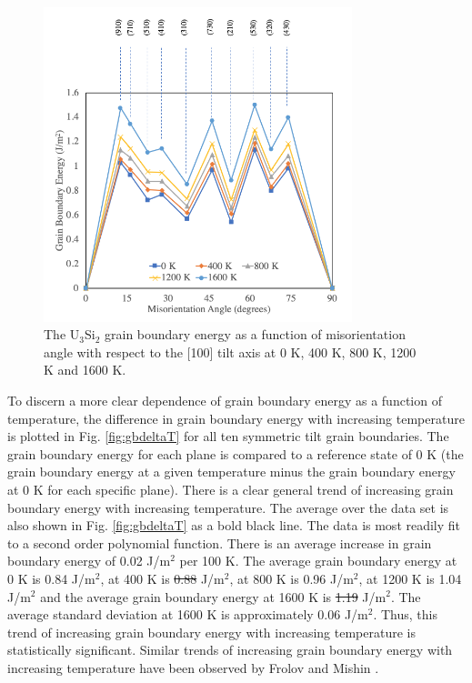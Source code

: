 \documentclass[review]{elsarticle}
\providecommand{\DIFaddtex}[1]{{\protect\color{blue}\uwave{#1}}} %
\providecommand{\DIFdeltex}[1]{{\protect\color{red}\sout{#1}}}                      %
\providecommand{\DIFaddbegin}{} %
\providecommand{\DIFaddend}{} %
\providecommand{\DIFdelbegin}{} %
\providecommand{\DIFdelend}{} %
\providecommand{\DIFadd}[1]{\texorpdfstring{\DIFaddtex{#1}}{#1}} %
\providecommand{\DIFdel}[1]{\texorpdfstring{\DIFdeltex{#1}}{}} %
\newcommand{\DIFscaledelfig}{0.5}
\newlength{\DIFdelgraphicswidth} %
\newlength{\DIFdelgraphicsheight} %
\newcommand{\DIFaddincludegraphics}[2][]{{\color{blue}\fbox{\DIFOincludegraphics[#1]{#2}}}} %
\newcommand{\DIFdelincludegraphics}[2][]{%
\sbox{\DIFdelgraphicsbox}{\DIFOincludegraphics[#1]{#2}}%
\settoboxwidth{\DIFdelgraphicswidth}{\DIFdelgraphicsbox} %
\settoboxtotalheight{\DIFdelgraphicsheight}{\DIFdelgraphicsbox} %
\scalebox{\DIFscaledelfig}{%
\parbox[b]{\DIFdelgraphicswidth}{\usebox{\DIFdelgraphicsbox}\\[-\baselineskip] \rule{\DIFdelgraphicswidth}{0em}}\llap{\resizebox{\DIFdelgraphicswidth}{\DIFdelgraphicsheight}{%
\setlength{\unitlength}{\DIFdelgraphicswidth}%
\begin{picture}(1,1)%
\thicklines\linethickness{2pt} %
{\color[rgb]{1,0,0}\put(0,0){\framebox(1,1){}}}%
{\color[rgb]{1,0,0}\put(0,0){\line( 1,1){1}}}%
{\color[rgb]{1,0,0}\put(0,1){\line(1,-1){1}}}%
\end{picture}%
}\hspace*{3pt}}} %
} %
\DeclareRobustCommand{\DIFaddbegin}{\DIFOaddbegin \let\includegraphics\DIFaddincludegraphics} %
\DeclareRobustCommand{\DIFaddend}{\DIFOaddend \let\includegraphics\DIFOincludegraphics} %
\DeclareRobustCommand{\DIFdelbegin}{\DIFOdelbegin \let\includegraphics\DIFdelincludegraphics} %
\DeclareRobustCommand{\DIFdelend}{\DIFOaddend \let\includegraphics\DIFOincludegraphics} %
\begin{document}
\begin{figure}[h]
 \centering
 \includegraphics[width=0.8\textwidth]{gb_vs_T.png} 
 \caption{The U$_{3}$Si$_{2}$ grain boundary energy as a function of misorientation angle with respect to the [100] tilt axis at 0 K, 400 K, 800 K, 1200 K and 1600 K.}
 \label{fig:gbtemp}
\end{figure}

\FloatBarrier

To discern a more clear dependence of grain boundary energy as a function of temperature, the difference in grain boundary energy with increasing temperature is plotted in Fig. \ref{fig:gbdeltaT} for all ten symmetric tilt grain boundaries. The grain boundary energy for each plane is compared to a reference state of 0 K (the grain boundary energy at a given temperature minus the grain boundary energy at 0 K for each specific plane). There is a clear general trend of increasing grain boundary energy with increasing temperature. The average over the data set is also shown in Fig. \ref{fig:gbdeltaT} as a bold black line. The data is most readily fit to a second order polynomial function. There is an average increase in grain boundary energy of 0.02 J/m$^{2}$ per 100 K. The average grain boundary energy at 0 K is 0.84 J/m$^{2}$, at 400 K is \DIFdelbegin \DIFdel{0.88 }\DIFdelend \DIFaddbegin \DIFadd{0.89 }\DIFaddend J/m$^{2}$, at 800 K is 0.96 J/m$^{2}$, at 1200 K is 1.04 J/m$^{2}$ and the average grain boundary energy at 1600 K is \DIFdelbegin \DIFdel{1.19 }\DIFdelend \DIFaddbegin \DIFadd{1.22 }\DIFaddend J/m$^{2}$. The average standard deviation at 1600 K is approximately 0.06 J/m$^{2}$. Thus, this trend of increasing grain boundary energy with increasing temperature is statistically significant. Similar trends of increasing grain boundary energy with increasing temperature have been observed by Frolov and Mishin \cite{frolov2012}. 
\end{document}
